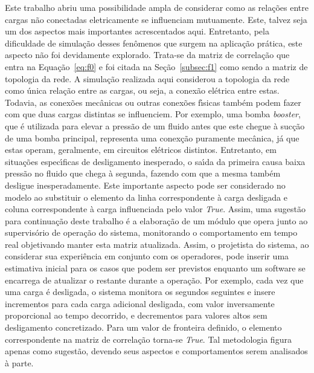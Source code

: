 Este trabalho abriu uma possibilidade ampla de considerar como as rela{\c c}{\~o}es entre cargas n{\~a}o conectadas eletricamente se influenciam mutuamente. Este, talvez seja um dos aspectos mais importantes acrescentados aqui. Entretanto, pela dificuldade de simula{\c c}{\~a}o desses fen{\^o}menos que surgem na aplica{\c c}{\~a}o pr{\'a}tica, este aspecto n{\~a}o foi devidamente explorado. Trata-se da matriz de correla{\c c}{\~a}o que entra na Equa{\c c}{\~a}o~\ref{eq:f0} e foi citada na Se{\c c}{\~a}o~\ref{subsec:f1} como sendo a matriz de topologia da rede. A simula{\c c}{\~a}o realizada aqui considerou a topologia da rede como {\'u}nica rela{\c c}{\~a}o entre as cargas, ou seja, a conex{\~a}o el{\'e}trica entre estas. Todavia, as conex{\~o}es mec{\^a}nicas ou outras conex{\~o}es f{\'\i}sicas tamb{\'e}m podem fazer com que duas cargas distintas se influenciem. Por exemplo, uma bomba \textit{booster}, que {\'e} utilizada para elevar a press{\~a}o de um fluido antes que este chegue {\`a} suc{\c c}{\~a}o de uma bomba principal, representa uma conex{\c c}{\~a}o puramente mec{\^a}nica, j{\'a} que estas operam, geralmente, em circuitos el{\'e}tricos distintos. Entretanto, em situa{\c c}{\~o}es espec{\'\i}ficas de desligamento inesperado, o sa{\'\i}da da primeira causa baixa press{\~a}o no fluido que chega {\`a} segunda, fazendo com que a mesma tamb{\'e}m desligue inesperadamente. Este importante aspecto pode ser considerado no modelo ao substituir o elemento da linha correspondente {\`a} carga desligada e coluna correspondente {\`a} carga influenciada pelo valor \textit{True}. Assim, uma sugest{\~a}o para continua{\c c}{\~a}o deste trabalho {\'e} a elabora{\c c}{\~a}o de um m{\'o}dulo que opera junto ao supervis{\'o}rio de opera{\c c}{\~a}o do sistema, monitorando o comportamento em tempo real objetivando manter esta matriz atualizada. Assim, o projetista do sistema, ao considerar sua experi{\^e}ncia em conjunto com os operadores, pode inserir uma estimativa inicial para os casos que podem ser previstos enquanto um software se encarrega de atualizar o restante durante a opera{\c c}{\~a}o. Por exemplo, cada vez que uma carga {\'e} desligada, o sistema monitora os segundos seguintes e insere incrementos para cada carga adicional desligada, com valor inversamente proporcional ao tempo decorrido, e decrementos para valores altos sem desligamento concretizado. Para um valor de fronteira definido, o elemento correspondente na matriz de correla{\c c}{\~a}o torna-se \textit{True}. Tal metodologia figura apenas como sugest{\~a}o, devendo seus aspectos e comportamentos serem analisados {\`a} parte.